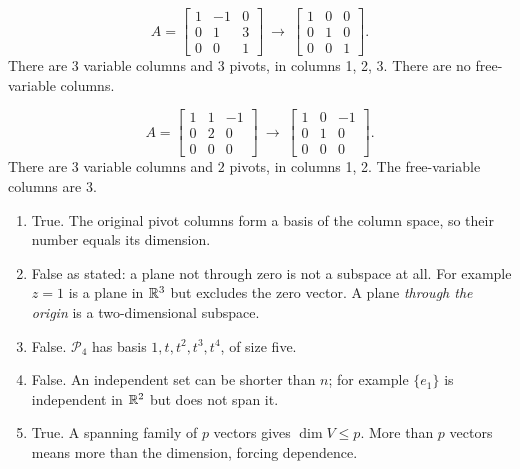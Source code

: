 \[A=\left[\begin{array}{rrr}1&-1&0\\0&1&3\\0&0&1\end{array}\right]\ \longrightarrow\ \left[\begin{array}{rrr}1&0&0\\0&1&0\\0&0&1\end{array}\right].\]
There are $3$ variable columns and $3$ pivots, in columns 1, 2, 3. There are no free-variable columns.

\[A=\left[\begin{array}{rrr}1&1&-1\\0&2&0\\0&0&0\end{array}\right]\ \longrightarrow\ \left[\begin{array}{rrr}1&0&-1\\0&1&0\\0&0&0\end{array}\right].\]
There are $3$ variable columns and $2$ pivots, in columns 1, 2. The free-variable columns are 3.

\begin{enumerate}[label=(\alph*)]
\item True. The original pivot columns form a basis of the column space,
so their number equals its dimension.
\item False as stated: a plane not through zero is not a subspace at all.
For example $z=1$ is a plane in $\mathbb{R}^3$ but excludes the zero vector.
A plane \emph{through the origin} is a two-dimensional subspace.
\item False. $\mathcal P_4$ has basis $1,t,t^2,t^3,t^4$, of size five.
\item False. An independent set can be shorter than $n$; for example
$\{e_1\}$ is independent in $\mathbb{R}^2$ but does not span it.
\item True. A spanning family of $p$ vectors gives $\dim V\le p$.
More than $p$ vectors means more than the dimension, forcing dependence.
\end{enumerate}

